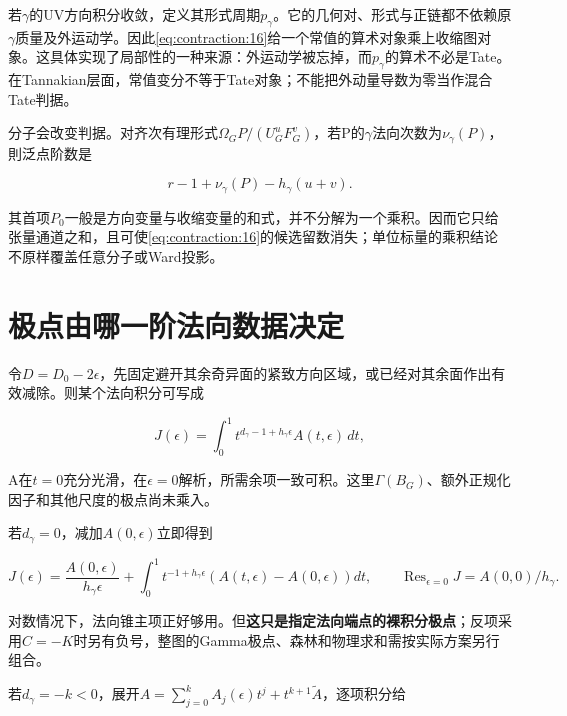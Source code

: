 \documentclass[11pt,a4paper,oneside]{ctexrep}
\theoremstyle{cnplain}
\theoremstyle{definition}
\theoremstyle{remark}
\begin{document}
若\(\gamma \)的UV方向积分收敛，定义其形式周期\(p_\gamma \)。它的几何对、形式与正链都不依赖原\(\gamma \)质量及外运动学。因此\eqref{eq:contraction:16}给一个常值的算术对象乘上收缩图对象。这具体实现了局部性的一种来源：外运动学被忘掉，而\(p_\gamma \)的算术不必是Tate。在Tannakian层面，常值变分不等于Tate对象；不能把外动量导数为零当作混合Tate判据。

分子会改变判据。对齐次有理形式\(\Omega _G P/(U_G^u F_G^v)\)，若P的\(\gamma \)法向次数为\(\nu _\gamma (P)\)，則泛点阶数是

\begin{equation}
r-1+\nu_\gamma(P)-h_\gamma(u+v).                 \label{eq:contraction:17}
\end{equation}

其首项\(P_0\)一般是方向变量与收缩变量的和式，并不分解为一个乘积。因而它只给张量通道之和，且可使\eqref{eq:contraction:16}的候选留数消失；单位标量的乘积结论不原样覆盖任意分子或Ward投影。

\section{极点由哪一阶法向数据决定}\label{sec:contraction:5}

令\(D=D_0- 2\epsilon \)，先固定避开其余奇异面的紧致方向区域，或已经对其余面作出有效减除。则某个法向积分可写成

\begin{equation}
J(\epsilon)=\int_0^1 t^{d_\gamma-1+h_\gamma\epsilon}
                                A(t,\epsilon)\,dt,             \label{eq:contraction:18}
\end{equation}

A在\(t=0\)充分光滑，在\(\epsilon =0\)解析，所需余项一致可积。这里\(\Gamma (B_G)\)、额外正规化因子和其他尺度的极点尚未乘入。

若\(d_\gamma =0\)，减加\(A(0,\epsilon )\)立即得到

\begin{equation}
J(\epsilon)=\frac{A(0,\epsilon)}{h_\gamma\epsilon}
      +\int_0^1 t^{-1+h_\gamma\epsilon}(A(t,\epsilon)-A(0,\epsilon))dt,
 \qquad\operatorname{Res}_{\epsilon=0}J=A(0,0)/h_\gamma.          \label{eq:contraction:19}
\end{equation}

对数情况下，法向锥主项正好够用。但\textbf{这只是指定法向端点的裸积分极点}；反项采用\(C=- K\)时另有负号，整图的Gamma极点、森林和物理求和需按实际方案另行组合。

若\(d_\gamma =- k<0\)，展开\(A=\sum _{j=0}^k A_j(\epsilon )t^j+t^{k+1}\widetilde A\)，逐项积分给
\end{document}
